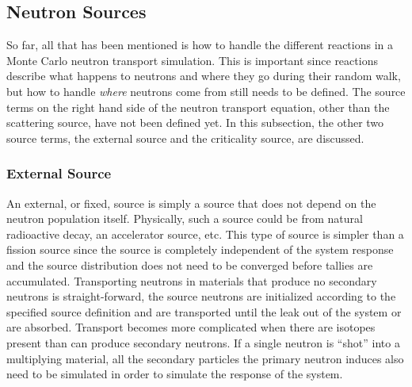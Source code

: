 

\subsection{Neutron Sources}

So far, all that has been mentioned is how to handle the different reactions in a Monte Carlo neutron transport simulation.  This is important since reactions describe what happens to neutrons and where they go during their random walk, but how to handle \emph{where} neutrons come from still needs to be defined.  The source terms on the right hand side of the neutron transport equation, other than the scattering source, have not been defined yet.  In this subsection, the other two source terms, the external source and the criticality source, are discussed.

\subsubsection{External Source}

An external, or fixed, source is simply a source that does not depend on the neutron population itself.  Physically, such a source could be from natural radioactive decay, an accelerator source, etc.  This type of source is simpler than a fission source since the source is completely independent of the system response and the source distribution does not need to be converged before tallies are accumulated.  Transporting neutrons in materials that produce no secondary neutrons is straight-forward, the source neutrons are initialized according to the specified source definition and are transported until the leak out of the system or are absorbed.  Transport becomes more complicated when there are isotopes present than can produce secondary neutrons.  If a single neutron is ``shot'' into a multiplying material, all the secondary particles the primary neutron induces also need to be simulated in order to simulate the response of the system.

